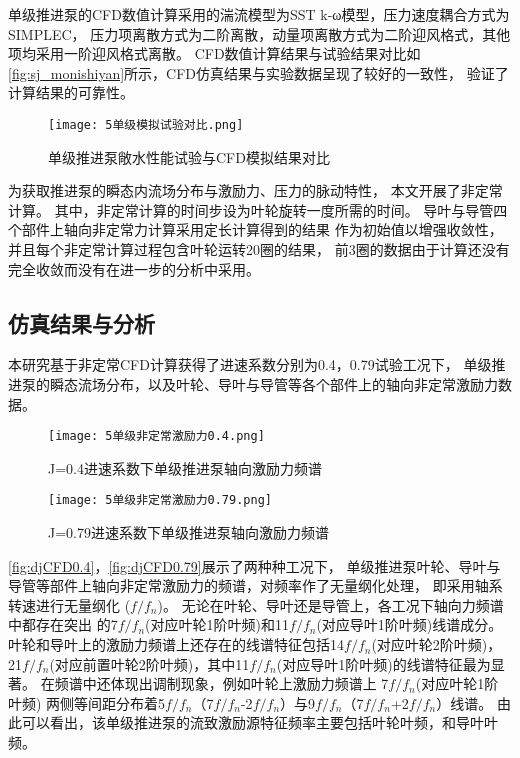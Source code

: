单级推进泵的CFD数值计算采用的湍流模型为SST k-ω模型，压力速度耦合方式为SIMPLEC，
压力项离散方式为二阶离散，动量项离散方式为二阶迎风格式，其他项均采用一阶迎风格式离散。
CFD数值计算结果与试验结果对比如\autoref{fig:sj_monishiyan}所示，CFD仿真结果与实验数据呈现了较好的一致性，
验证了计算结果的可靠性。
\begin{figure}[htbp]
    \centering
    \texttt{[image: 5单级模拟试验对比.png]}
    \caption{\label{fig:sj_monishiyan}单级推进泵敞水性能试验与CFD模拟结果对比}
\end{figure}

为获取推进泵的瞬态内流场分布与激励力、压力的脉动特性，
本文开展了非定常计算。
其中，非定常计算的时间步设为叶轮旋转一度所需的时间。
导叶与导管四个部件上轴向非定常力计算采用定长计算得到的结果
作为初始值以增强收敛性，并且每个非定常计算过程包含叶轮运转20圈的结果，
前3圈的数据由于计算还没有完全收敛而没有在进一步的分析中采用。
\subsection{仿真结果与分析}
本研究基于非定常CFD计算获得了进速系数分别为0.4，0.79试验工况下，
单级推进泵的瞬态流场分布，以及叶轮、导叶与导管等各个部件上的轴向非定常激励力数据。
\begin{figure}[htbp]
    \centering
    \texttt{[image: 5单级非定常激励力0.4.png]}
    \caption{\label{fig:djCFD0.4}J=0.4进速系数下单级推进泵轴向激励力频谱}
\end{figure}
\begin{figure}[htbp]
    \centering
    \texttt{[image: 5单级非定常激励力0.79.png]}
    \caption{\label{fig:djCFD0.79}J=0.79进速系数下单级推进泵轴向激励力频谱}
\end{figure}
\autoref{fig:djCFD0.4}，\autoref{fig:djCFD0.79}展示了两种种工况下，
单级推进泵叶轮、导叶与导管等部件上轴向非定常激励力的频谱，对频率作了无量纲化处理，
即采用轴系转速进行无量纲化 ($f/f_n$)。
无论在叶轮、导叶还是导管上，各工况下轴向力频谱中都存在突出
的7$f/f_n$(对应叶轮1阶叶频)和11$f/f_n$(对应导叶1阶叶频)线谱成分。
叶轮和导叶上的激励力频谱上还存在的线谱特征包括14$f/f_n$(对应叶轮2阶叶频)，
21$f/f_n$(对应前置叶轮2阶叶频)，其中11$f/f_n$(对应导叶1阶叶频)的线谱特征最为显著。
在频谱中还体现出调制现象，例如叶轮上激励力频谱上
7$f/f_n$(对应叶轮1阶叶频)
两侧等间距分布着5$f/f_n$（7$f/f_n$-2$f/f_n$）与9$f/f_n$（7$f/f_n$+2$f/f_n$）线谱。
由此可以看出，该单级推进泵的流致激励源特征频率主要包括叶轮叶频，和导叶叶频。
